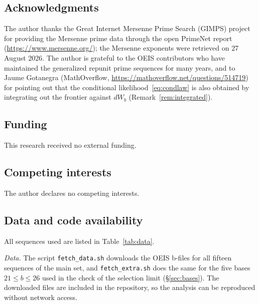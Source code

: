 \documentclass[11pt,a4paper]{article}
\theoremstyle{plain}
\theoremstyle{remark}
\begin{document}
\subsection*{Acknowledgments}
The author thanks the Great Internet Mersenne Prime Search (GIMPS) project for
providing the Mersenne prime data through the open PrimeNet report
(\url{https://www.mersenne.org/}); the Mersenne exponents were retrieved on
27 August 2026. The author is grateful to the OEIS contributors who have
maintained the generalized repunit prime sequences for many years, and to Jaume
Gotanegra (MathOverflow, \url{https://mathoverflow.net/questions/514719}) for
pointing out that the conditional likelihood~\eqref{eq:condlaw} is also obtained
by integrating out the frontier against $dW_b$ (Remark~\ref{rem:integrated}).

\subsection*{Funding}
This research received no external funding.

\subsection*{Competing interests}
The author declares no competing interests.

\subsection*{Data and code availability}
All sequences used are listed in Table~\ref{tab:data}.

\emph{Data.} The script \texttt{fetch\_data.sh} downloads the OEIS b-files for
all fifteen sequences of the main set, and \texttt{fetch\_extra.sh} does the
same for the five bases $21\le b\le26$ used in the check of the selection limit
(\S\ref{sec:bases}). The downloaded files are included in the repository, so the
analysis can be reproduced without network access.
\end{document}
